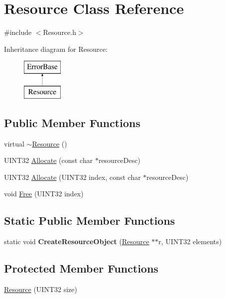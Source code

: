 \hypertarget{classResource}{
\section{Resource Class Reference}
\label{classResource}
}


{\ttfamily \#include $<$Resource.h$>$}

Inheritance diagram for Resource:\begin{figure}[H]
\begin{center}
\leavevmode
\includegraphics[height=2.000000cm]{classResource}
\end{center}
\end{figure}
\subsection*{Public Member Functions}
\begin{DoxyCompactItemize}
\item 
virtual \hyperlink{classResource_a0e5ec475e2601bdb33644468e86f6f10}{$\sim$Resource} ()
\item 
UINT32 \hyperlink{classResource_a1146abcb449682d03e1a1f95580ab53b}{Allocate} (const char $\ast$resourceDesc)
\item 
UINT32 \hyperlink{classResource_ad0bb83eed91d50832b953eb80b720d68}{Allocate} (UINT32 index, const char $\ast$resourceDesc)
\item 
void \hyperlink{classResource_a1f8793fe4ecfcd6c4ae1417c3d0745ca}{Free} (UINT32 index)
\end{DoxyCompactItemize}
\subsection*{Static Public Member Functions}
\begin{DoxyCompactItemize}
\item 
\hypertarget{classResource_ade155b92abe4ff2b0c43576434033922}{
static void {\bfseries CreateResourceObject} (\hyperlink{classResource}{Resource} $\ast$$\ast$r, UINT32 elements)}
\label{classResource_ade155b92abe4ff2b0c43576434033922}

\end{DoxyCompactItemize}
\subsection*{Protected Member Functions}
\begin{DoxyCompactItemize}
\item 
\hyperlink{classResource_a0b78cc75804fa191429da3cc501ad5ab}{Resource} (UINT32 size)
\end{DoxyCompactItemize}


